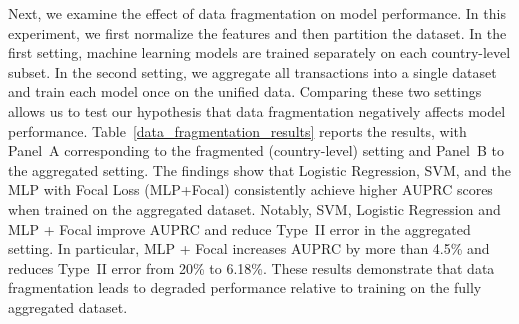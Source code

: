 \documentclass[11pt,english]{article}
\begin{document}
Next, we examine the effect of data fragmentation on model performance. In this experiment, we first normalize the features and then partition the dataset. In the first setting, machine learning models are trained separately on each country-level subset. In the second setting, we aggregate all transactions into a single dataset and train each model once on the unified data. Comparing these two settings allows us to test our hypothesis that data fragmentation negatively affects model performance. Table~\ref{data_fragmentation_results} reports the results, with Panel~A corresponding to the fragmented (country-level) setting and Panel~B to the aggregated setting. The findings show that Logistic Regression, SVM, and the MLP with Focal Loss (MLP+Focal) consistently achieve higher AUPRC scores when trained on the aggregated dataset. Notably, SVM, Logistic Regression and MLP + Focal improve AUPRC and reduce Type~II error in the aggregated setting. In particular, MLP + Focal increases AUPRC by more than 4.5\% and reduces Type~II error from 20\% to 6.18\%. These results demonstrate that data fragmentation leads to degraded performance relative to training on the fully aggregated dataset.
 
\end{document}
